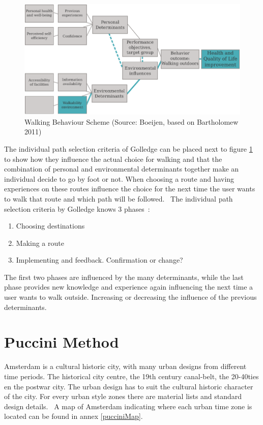 \begin{figure}[h]
\includegraphics[width=\textwidth]{img/B_bartolomew.pdf}
\centering
\caption[Walking Behaviour Scheme]{Walking Behaviour Scheme (Source: Boeijen, based on Bartholomew 2011)
\label{behaviour}}
\end{figure}

The individual path selection criteria of Golledge can be placed next to figure \ref{behaviour} to show how they influence the actual choice for walking and that the combination of personal and environmental determinants together make an individual decide to go by foot or not. When choosing a route and having experiences on these routes influence the choice for the next time the user wants to walk that route and which path will be followed.~\cite{Golledge2002} The individual path selection criteria by Golledge knows 3 phases~\cite{Golledge2002}: 
\begin{enumerate}
\item Choosing destinations 
\item Making a route 
\item Implementing and feedback. Confirmation or change?
\end{enumerate}
The first two phases are influenced by the many determinants, while the last phase provides new knowledge and experience again influencing the next time a user wants to walk outside. Increasing or decreasing the influence of the previous determinants. 


\section{Puccini Method}\label{puccini}
Amsterdam is a cultural historic city, with many urban designs from different time periods. The historical city centre, the 19th century canal-belt, the 20-40ties en the postwar city. The urban design has to suit the cultural historic character of the city. For every urban style zones there are material lists and standard design details.~\cite{puccini2014} A map of Amsterdam indicating where each urban time zone is located can be found in annex \ref{pucciniMap}.

